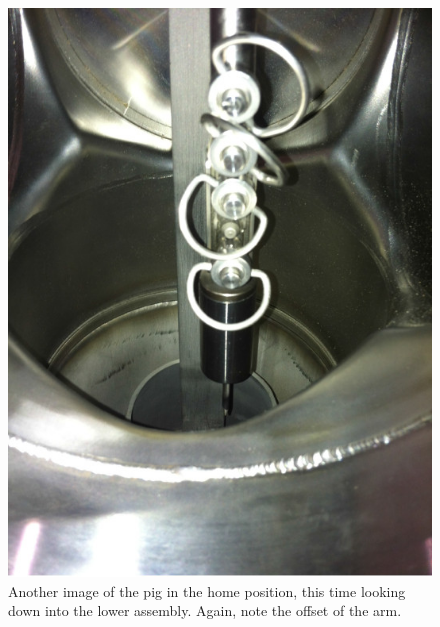 \begin{itemize}
\begin{figure}[htbp]
 \centering
 \includegraphics[width=5in]{Figures/ArticulationOffset2.jpg}
 \caption{Another image of the pig in the home position, this time looking down into the lower assembly. Again, note the offset of the arm.}
 \label{fig:art_offset2}
\end{figure}


\end{itemize}
